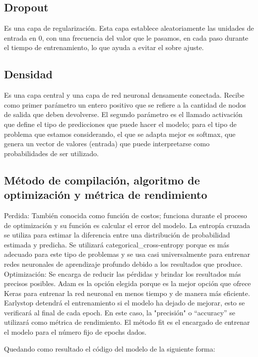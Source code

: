 \documentclass[12pt, a4paper, titlepage]{article}
\begin{document}
	\subsection{Dropout}
	Es una capa de regularización. Esta capa establece aleatoriamente las unidades de entrada en 0, con una frecuencia del valor que le pasamos, en cada paso durante el tiempo de entrenamiento, lo que ayuda a evitar el sobre ajuste.
	\begin{center}
		
	\end{center}
	\subsection{Densidad}
	Es una capa central y una capa de red neuronal densamente conectada. Recibe como primer parámetro un entero positivo que se refiere a la cantidad de nodos de salida que deben devolverse. El segundo parámetro es el llamado activación que define el tipo de predicciones que puede hacer el modelo; para el tipo de problema que estamos considerando, el que se adapta mejor es softmax, que genera un vector de valores (entrada) que puede interpretarse como probabilidades de ser utilizado.
	\begin{center}
		
	\end{center}
	\subsection{Método de compilación, algoritmo de optimización y métrica de rendimiento}
	Perdida: También conocida como función de costos; funciona durante el proceso de optimización y su función es calcular el error del modelo. La entropía cruzada se utiliza para estimar la diferencia entre una distribución de probabilidad estimada y predicha. Se utilizará categorical\_cross-entropy porque es más adecuado para este tipo de problemas y se usa casi universalmente para entrenar redes neuronales de aprendizaje profundo debido a los resultados que produce.
	Optimización: Se encarga de reducir las pérdidas y brindar los resultados más precisos posibles. Adam es la opción elegida porque es la mejor opción que ofrece Keras para entrenar la red neuronal en menos tiempo y de manera más eficiente. Earlystop detendrá el entrenamiento si el modelo ha dejado de mejorar, esto se verificará al final de cada epoch. En este caso, la "precisión" o “accuracy” se utilizará como métrica de rendimiento.
	El método fit es el encargado de entrenar el modelo para el número fijo de epochs dados.	
	\begin{center}
		
	\end{center}
	Quedando como resultado el código del modelo de la siguiente forma:
	\begin{center}
		
	\end{center}
\end{document}
